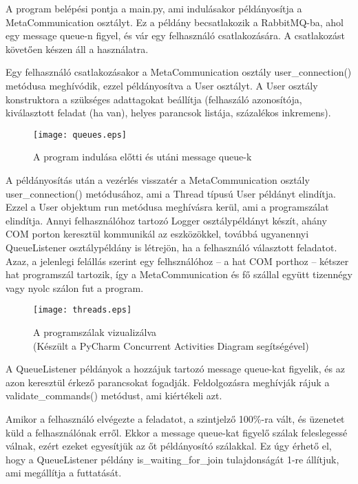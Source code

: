 \documentclass[12pt]{report}
\begin{document}
A program belépési pontja a main.py, ami indulásakor példányosítja a MetaCommunication osztályt.
Ez a példány becsatlakozik a RabbitMQ-ba, ahol egy message queue-n figyel, és vár egy felhasználó csatlakozására. A csatlakozást követően készen áll a használatra.

Egy felhasználó csatlakozásakor a MetaCommunication osztály user\_connection() metódusa meghívódik, ezzel példányosítva a User osztályt. A User osztály konstruktora a szükséges adattagokat beállítja (felhaszáló azonosítója, kiválasztott feladat (ha van), helyes parancsok listája, százalékos inkremens).


\begin{figure}[h]
    \centering
    \texttt{[image: queues.eps]}
    \caption{A program indulása előtti és utáni message queue-k}
\end{figure}



A példányosítás után a vezérlés visszatér a MetaCommunication osztály user\_connection() metódusához, ami a Thread típusú User példányt elindítja. Ezzel a User objektum run metódusa meghívásra kerül, ami a programszálat elindítja. Annyi felhasználóhoz tartozó Logger osztálypéldányt készít, ahány COM porton keresztül kommunikál az eszközökkel, továbbá ugyanennyi  QueueListener osztálypéldány is létrejön, ha a felhasználó választott feladatot. Azaz, a jelenlegi felállás szerint egy felhsználóhoz -- a hat COM porthoz -- kétszer hat programszál tartozik, így a MetaCommunication és fő szállal együtt tizennégy vagy nyolc szálon fut a program.

\begin{figure}[h]
    \centering
    \texttt{[image: threads.eps]}
    \caption{A programszálak vizualizálva\\(Készült a PyCharm Concurrent Activities Diagram segítségével)}
\end{figure}

A QueueListener példányok a hozzájuk tartozó message queue-kat figyelik, és az azon keresztül érkező parancsokat fogadják. Feldolgozásra meghívják rájuk a validate\_commands() metódust, ami kiértékeli azt.


Amikor a felhasználó elvégezte a feladatot, a szintjelző 100\%-ra vált, és üzenetet küld a felhasználónak erről.
Ekkor a message queue-kat figyelő szálak feleslegessé válnak, ezért ezeket egyesítjük az őt példányosító szálakkal. 
Ez úgy érhető el, hogy a QueueListener példány is\_waiting\_for\_join tulajdonságát 1-re állítjuk, ami megállítja a futtatását.
\end{document}
